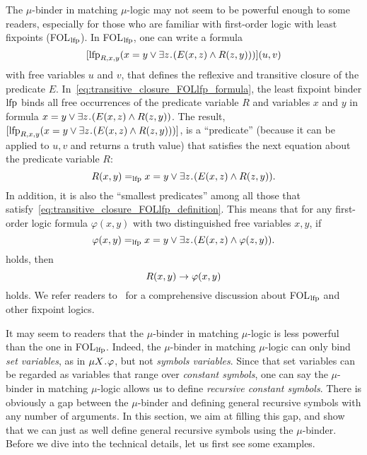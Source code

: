 \documentclass{amsart}
\begin{document}
The $\mu$-binder in matching $\mu$-logic may not
seem to be powerful enough to some readers, especially
for those who are familiar with first-order logic
with least fixpoints (FOL$_{\mathrm{lfp}}$).
In FOL$_{\mathrm{lfp}}$, one can write a formula
\begin{equation}
\label{eq:transitive_closure_FOLlfp_formula}
[\mathrm{lfp}_{R,x,y} (x = y \vee \exists z \mathbin{\!.\!} ( E(x,z) \wedge R(z,y) ))](u,v)
\end{equation}
with free variables $u$ and $v$, that defines
the reflexive and transitive closure of the predicate $E$.
In~\eqref{eq:transitive_closure_FOLlfp_formula},
the least fixpoint binder $\mathrm{lfp}$ binds all free occurrences of
the predicate variable $R$ and variables $x$ and $y$
in formula
$x = y \vee \exists z \mathbin{\!.\!} ( E(x,z) \wedge R(z,y) )$.
The result,
$[\mathrm{lfp}_{R,x,y} (x = y \vee \exists z \mathbin{\!.\!} ( E(x,z) \wedge R(z,y) ))]$,
is a ``predicate'' 
(because it can be applied to $u,v$ and returns a truth value)
that satisfies the next equation about the predicate variable $R$:
\begin{equation}
\label{eq:transitive_closure_FOLlfp_definition}
R(x,y) =_{\mathrm{lfp}} x = y \vee \exists z \mathbin{\!.\!} ( E(x,z) \wedge R(z,y) ).
\end{equation}
In addition, it is also the ``smallest predicates'' among
all those that satisfy~\eqref{eq:transitive_closure_FOLlfp_definition}.
This means that for any first-order logic formula $\varphi(x,y)$ with
two distinguished free variables $x,y$,
if
\begin{equation}
\varphi(x,y) =_{\mathrm{lfp}} x = y \vee \exists z \mathbin{\!.\!} ( E(x,z) \wedge \varphi(z,y) ).
\end{equation}
holds, then
\begin{equation}
R(x,y) \to \varphi(x,y)
\end{equation}
holds.
We refer readers to~\cite{bibid} for a comprehensive discussion about
FOL$_{\mathrm{lfp}}$ and other fixpoint logics. 

It may seem to readers that the $\mu$-binder in matching $\mu$-logic
is less powerful than the one in FOL$_{\mathrm{lfp}}$.
Indeed, the $\mu$-binder in matching $\mu$-logic can only bind
\emph{set variables}, as in $\mu X \mathbin{\!.\!} \varphi$, but not
\emph{symbols variables}.
Since that set variables can be regarded as variables that range over
\emph{constant symbols},
one can say
the $\mu$-binder in matching $\mu$-logic allows us to define
\emph{recursive constant symbols}. 
There is obviously a gap between the $\mu$-binder
and defining general recursive symbols with any number of arguments.
In this section, we aim at filling this gap,
and show that we can just as well define
general recursive symbols using the $\mu$-binder.
Before we dive into the technical details,
let us first see some examples.
\end{document}
